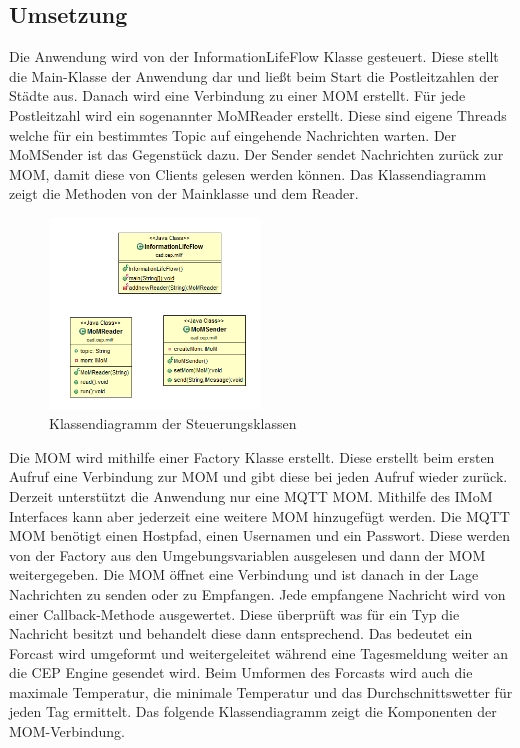 \subsection{Umsetzung}
Die Anwendung wird von der InformationLifeFlow Klasse gesteuert. Diese stellt die Main-Klasse der Anwendung dar und ließt beim Start die Postleitzahlen der Städte aus. Danach wird eine Verbindung zu einer MOM erstellt. Für jede Postleitzahl wird ein sogenannter MoMReader erstellt. Diese sind eigene Threads welche für ein bestimmtes Topic auf eingehende Nachrichten warten. Der MoMSender ist das Gegenstück dazu. Der Sender sendet Nachrichten zurück zur MOM, damit diese von Clients gelesen werden können. Das Klassendiagramm zeigt die Methoden von der Mainklasse und dem Reader.
\begin{figure}[htbp]
	\centering
	\includegraphics[width=0.5\textwidth]{Bilder/FlowAndReader.png}
	\caption{Klassendiagramm der Steuerungsklassen}
	\label{img:flowDiagramm}
\end{figure} 
Die MOM wird mithilfe einer Factory Klasse erstellt. Diese erstellt beim ersten Aufruf eine Verbindung zur MOM und gibt diese bei jeden Aufruf wieder zurück. Derzeit unterstützt die Anwendung nur eine MQTT MOM. Mithilfe des IMoM Interfaces kann aber jederzeit eine weitere MOM hinzugefügt werden. Die MQTT MOM benötigt einen Hostpfad, einen Usernamen und ein Passwort. Diese werden von der Factory aus den Umgebungsvariablen ausgelesen und dann der MOM weitergegeben. Die MOM öffnet eine Verbindung und ist danach in der Lage Nachrichten zu senden oder zu Empfangen. Jede empfangene Nachricht wird von einer Callback-Methode ausgewertet. Diese überprüft was für ein Typ die Nachricht besitzt und behandelt diese dann entsprechend. Das bedeutet ein Forcast wird umgeformt und weitergeleitet während eine Tagesmeldung weiter an die CEP Engine gesendet wird. Beim Umformen des Forcasts wird auch die maximale Temperatur, die minimale Temperatur und das Durchschnittswetter für jeden Tag ermittelt. Das folgende Klassendiagramm zeigt die Komponenten der MOM-Verbindung.
